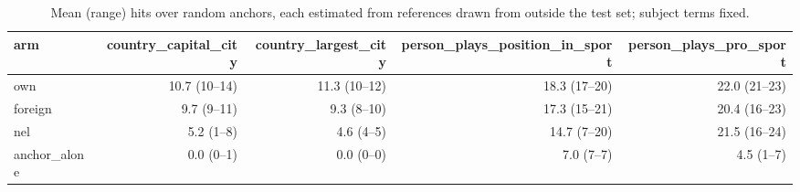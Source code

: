 \begin{table}[t]
\centering
\caption{Mean (range) hits over random anchors, each estimated from references drawn from outside the test set; subject terms fixed.}
\label{tab:swapanchor}
\begin{tabular}{lrrrr}
\toprule
arm & country\_capital\_city & country\_largest\_city & person\_plays\_position\_in\_sport & person\_plays\_pro\_sport \\
\midrule
own & 10.7 (10--14) & 11.3 (10--12) & 18.3 (17--20) & 22.0 (21--23) \\
foreign & 9.7 (9--11) & 9.3 (8--10) & 17.3 (15--21) & 20.4 (16--23) \\
nel & 5.2 (1--8) & 4.6 (4--5) & 14.7 (7--20) & 21.5 (16--24) \\
anchor_alone & 0.0 (0--1) & 0.0 (0--0) & 7.0 (7--7) & 4.5 (1--7) \\
\bottomrule
\end{tabular}
\end{table}
